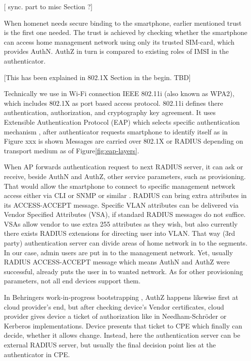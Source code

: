 \documentclass[12pt,a4paper,english]{tutthesis}
\begin{document}
[ sync. part to misc Section ?]





When homenet needs secure binding to the smartphone, earlier
mentioned trust is the first one needed.  The trust is achieved by
checking whether the smartphone can access home management
network using only its trusted SIM-card, which provides AuthN. AuthZ in
turn is compared to existing roles of IMSI in the authenticator.


[This has been explained in 802.1X Section in the begin. TBD]

Technically we use in Wi-Fi connection IEEE 802.11i (also known as WPA2), which includes
802.1X as port based access protocol.  802.11i defines there
authentication, authorization, and cryptography key agreement.
 It uses 
Extensible Authentication Protocol (EAP) which selects specific
authentication mechanism \cite[p.3]{rfc5247}, after authenticator
requests smartphone to identify itself as in Figure xxx is shown
Messages are carried over 802.1X or RADIUS depending on transport
medium as of Figure\ref{fig:eap-layers}.


When AP forwards authentication request to next RADIUS server, it can
ask or receive, beside AuthN and AuthZ, other service parameters, such
as provisioning. That would allow the smartphone to connect to
specific management network access either via CLI or SNMP or similar
 \cite[p.4]{rfc5608}.  RADIUS can bring extra attributes in its
ACCESS-ACCEPT message.  Specific VLAN attributes can be delivered via
Vendor Specified Attributes (VSA),
if standard RADIUS messages do not suffice.  VSAs allow vendor to use
extra 255 attributes as they wish, but also currently
there exists RADIUS extensions for directing user into VLAN. 
That way (3rd party) authentication server can divide areas of home
network in to the segments. In our case, admin users are put in to
the management network.
  Yet, usually RADIUS ACCESS-ACCEPT message which means AuthN and
AuthZ were successful, already puts the user in to wanted network. As
for other provisioning parameters, not all end devices support them.






In Behringers work-in-progress  bootstrapping \cite{draft-behringer-bootstrap},
AuthZ happens likewise first at cloud provider's
end, but after checking device's Vendor certificates, cloud provider
gives device a ticket of authorization like in Needham-Schröder or
Kerberos implementations. Device presents that ticket to CPE which
finally can decide, whether it allows change. 
Instead, here the authentication server can be external RADIUS server,
but usually the final decision point lies at the authenticator in CPE.
\end{document}

